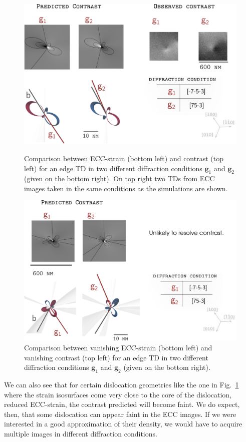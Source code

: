 \clearpage
\begin{figure}[htb]
    \centering
    \includegraphics[width=0.8\linewidth]{Figures/edgecompare.png}
    \caption[ECC-strain vs contrast for an edge TD]{ Comparison between ECC-strain (bottom left) and contrast (top left) for an edge TD in two different diffraction conditions $\textbf{g}_1$ and $\textbf{g}_2$ (given on the bottom right). On top right two TDs from ECC images taken in the same conditions as the simulations are shown.}
    \label{fig:edgecompare}

 \vspace*{\floatsep}

    \includegraphics[width=0.8\linewidth]{Figures/edgecompare0.png}
    \caption[Vanishing ECC-strain vs vanishing contrast for an edge TD]{ Comparison between vanishing ECC-strain (bottom left) and vanishing contrast (top left) for an edge TD in two different diffraction conditions $\textbf{g}_1$ and $\textbf{g}_2$ (given on the bottom right).}
    \label{fig:edgecompare0}
\end{figure}
\clearpage




We can also see that for certain dislocation geometries like the one in Fig.~\ref{fig:edgecompare0} where the strain isosurfaces come very close to the core of the dislocation, \ie reduced ECC-strain, the contrast predicted will become faint. We do expect, then, that some dislocation can appear faint in the ECC images. If we were interested in a good approximation of their density, we would have to acquire multiple images in different diffraction conditions. 






